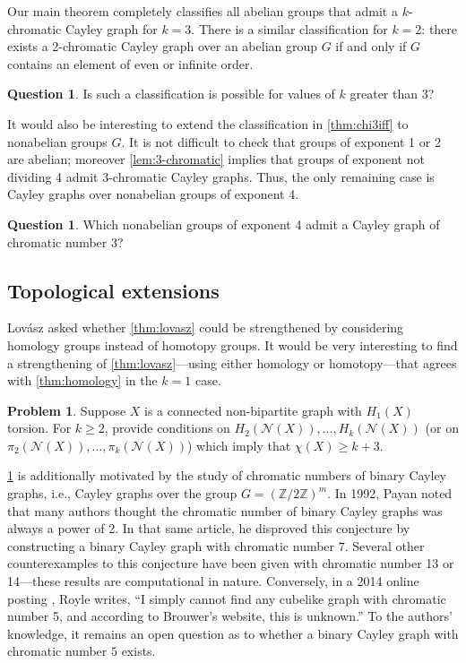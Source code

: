 \documentclass[12pt,letterpaper]{amsart}
\theoremstyle{definition}
\newtheorem{question}[theorem]{Question}
\newtheorem{problem}[theorem]{Problem}
\theoremstyle{remark}
\newcommand{\N}{{\mathcal N}}
\newcommand{\Z}{{\mathbb Z}}
\begin{document}
Our main theorem completely classifies all abelian groups that admit a $k$-chromatic Cayley graph for $k=3$. There is a similar classification for $k=2$: there exists a 2-chromatic Cayley graph over an abelian group $G$ if and only if $G$ contains an element of even or infinite order.  
\begin{question}
Is such a classification is possible for values of $k$ greater than $3$? 
\end{question}
 
 It would also be interesting to extend the classification in \cref{thm:chi3iff} to nonabelian groups $G$. It is not difficult to check that groups of exponent 1 or 2 are abelian; moreover \cref{lem:3-chromatic} implies that groups of exponent not dividing 4 admit 3-chromatic Cayley graphs. Thus, the only remaining case is Cayley graphs over nonabelian groups of exponent 4.
  
\begin{question}
Which nonabelian groups of exponent 4 admit a Cayley graph of chromatic number 3?
\end{question}



\subsection{Topological extensions}

Lov\'asz \cite{Lov} asked whether \cref{thm:lovasz} could be strengthened by considering homology groups instead of homotopy groups. It would be very interesting to find a strengthening of \cref{thm:lovasz}---using either homology or homotopy---that agrees with \cref{thm:homology} in the $k=1$ case.

\begin{problem}\label{problem:homology}
Suppose $X$ is a connected non-bipartite graph with $H_1(X)$ torsion. For $k\geq 2$, provide conditions on $H_2(\N(X)),\ldots,H_k(\N(X))$ (or on $\pi_2(\N(X)),\ldots,\pi_k(\N(X))$) which imply that $\chi(X)\geq k+3$.
\end{problem}

\cref{problem:homology} is additionally motivated by the study of chromatic numbers of binary Cayley graphs, i.e., Cayley graphs over the group $G=(\Z/2\Z)^m$. In 1992, Payan \cite{Pay} noted that many authors thought the chromatic number of binary Cayley graphs was always a power of 2. In that same article, he disproved this conjecture by constructing a binary Cayley graph with chromatic number $7$. Several other counterexamples \cite{Kok,Lau} to this conjecture have been given with chromatic number 13 or 14---these results are computational in nature. Conversely, in a 2014 online posting \cite{Roy}, Royle writes, ``I simply cannot find any cubelike graph with chromatic number 5, and according to Brouwer's website, this is unknown.''  To the authors' knowledge, it remains an open question as to whether a binary Cayley graph with chromatic number $5$ exists.
\end{document}
